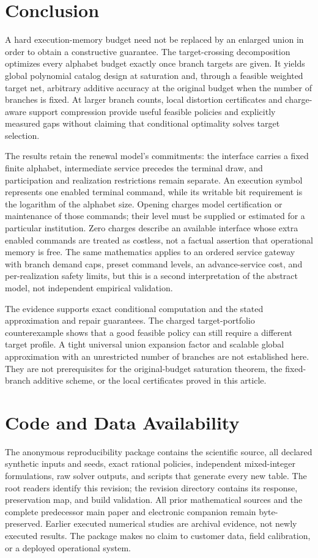 \section{Conclusion}
A hard execution-memory budget need not be replaced by an enlarged union in order to obtain a constructive guarantee. The target-crossing decomposition optimizes every alphabet budget exactly once branch targets are given. It yields global polynomial catalog design at saturation and, through a feasible weighted target net, arbitrary additive accuracy at the original budget when the number of branches is fixed. At larger branch counts, local distortion certificates and charge-aware support compression provide useful feasible policies and explicitly measured gaps without claiming that conditional optimality solves target selection.

The results retain the renewal model's commitments: the interface carries a fixed finite alphabet, intermediate service precedes the terminal draw, and participation and realization restrictions remain separate. An execution symbol represents one enabled terminal command, while its writable bit requirement is the logarithm of the alphabet size. Opening charges model certification or maintenance of those commands; their level must be supplied or estimated for a particular institution. Zero charges describe an available interface whose extra enabled commands are treated as costless, not a factual assertion that operational memory is free. The same mathematics applies to an ordered service gateway with branch demand caps, preset command levels, an advance-service cost, and per-realization safety limits, but this is a second interpretation of the abstract model, not independent empirical validation.

The evidence supports exact conditional computation and the stated approximation and repair guarantees. The charged target-portfolio counterexample shows that a good feasible policy can still require a different target profile. A tight universal union expansion factor and scalable global approximation with an unrestricted number of branches are not established here. They are not prerequisites for the original-budget saturation theorem, the fixed-branch additive scheme, or the local certificates proved in this article.

\section*{Code and Data Availability}
The anonymous reproducibility package contains the scientific source, all declared synthetic inputs and seeds, exact rational policies, independent mixed-integer formulations, raw solver outputs, and scripts that generate every new table. The root readers identify this revision; the revision directory contains its response, preservation map, and build validation. All prior mathematical sources and the complete predecessor main paper and electronic companion remain byte-preserved. Earlier executed numerical studies are archival evidence, not newly executed results. The package makes no claim to customer data, field calibration, or a deployed operational system.
